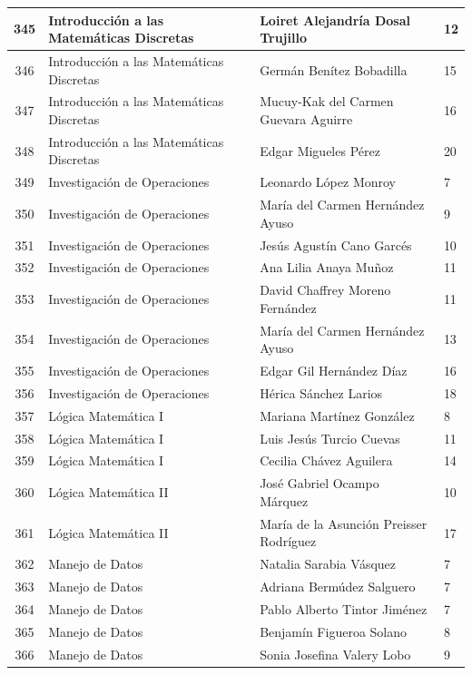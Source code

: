 {\begin{longtable}{|c|p{6.5cm}|p{5cm}|p{1.5cm}|}
  345 & Introducción a las Matemáticas Discretas & Loiret Alejandría Dosal Trujillo & 12 \\ \hline 
  346 & Introducción a las Matemáticas Discretas & Germán Benítez Bobadilla & 15 \\ \hline 
  347 & Introducción a las Matemáticas Discretas & Mucuy-Kak del Carmen Guevara Aguirre & 16 \\ \hline 
  348 & Introducción a las Matemáticas Discretas & Edgar Migueles Pérez & 20 \\ \hline 
  349 & Investigación de Operaciones & Leonardo López Monroy & 7 \\ \hline 
  350 & Investigación de Operaciones & María del Carmen Hernández Ayuso & 9 \\ \hline 
  351 & Investigación de Operaciones & Jesús Agustín Cano Garcés & 10 \\ \hline 
  352 & Investigación de Operaciones & Ana Lilia Anaya Muñoz & 11 \\ \hline 
  353 & Investigación de Operaciones & David Chaffrey Moreno Fernández & 11 \\ \hline 
  354 & Investigación de Operaciones & María del Carmen Hernández Ayuso & 13 \\ \hline 
  355 & Investigación de Operaciones & Edgar Gil Hernández Díaz & 16 \\ \hline 
  356 & Investigación de Operaciones & Hérica Sánchez Larios & 18 \\ \hline 
  357 & Lógica Matemática I & Mariana Martínez González & 8 \\ \hline 
  358 & Lógica Matemática I & Luis Jesús Turcio Cuevas & 11 \\ \hline 
  359 & Lógica Matemática I & Cecilia Chávez Aguilera & 14 \\ \hline 
  360 & Lógica Matemática II & José Gabriel Ocampo Márquez & 10 \\ \hline 
  361 & Lógica Matemática II & María de la Asunción Preisser Rodríguez & 17 \\ \hline 
  362 & Manejo de Datos & Natalia Sarabia Vásquez & 7 \\ \hline 
  363 & Manejo de Datos & Adriana Bermúdez Salguero & 7 \\ \hline 
  364 & Manejo de Datos & Pablo Alberto Tintor Jiménez & 7 \\ \hline 
  365 & Manejo de Datos & Benjamín Figueroa Solano & 8 \\ \hline 
  366 & Manejo de Datos & Sonia Josefina Valery Lobo & 9 \\ \hline 

\end{longtable}}
